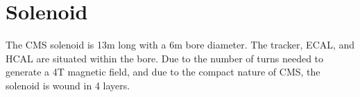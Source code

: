 
\section{Solenoid}\label{sec:solenoid}

The CMS solenoid is 13m long with a 6m bore diameter. The tracker, ECAL, and HCAL are situated within the bore. Due to the number of turns needed to generate a 4T magnetic field, and due to the compact nature of CMS, the solenoid is wound in 4 layers.

